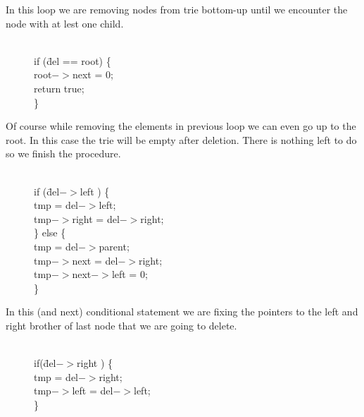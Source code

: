 \documentclass[a4paper,12pt]{article}
\begin{document}
\noindent In this loop we are removing nodes from trie bottom-up until we encounter the node with at lest one child.

\begin{figure}[!h]
\begin{tabbing}
\quad \quad \= \\
\>  if (\=del == root) \{ \\
\>\>    root$->$next = 0; \\
\>\>    return true; \\
\>  \} \\
\end{tabbing}
\end{figure}

\noindent Of course while removing the elements in previous loop we can even go up to the root. In this case the trie will be empty after deletion. There is nothing left to do so we finish the procedure.

\begin{figure}[!h]
\begin{tabbing}
\quad \quad \= \\
\>  if (\= del$->$left ) \{ \\
\>\>    tmp = del$->$left; \\
\>\>    tmp$->$right = del$->$right; \\
\>  \} else \{ \\
\>\>    tmp = del$->$parent; \\
\>\>    tmp$->$next = del$->$right; \\
\>\>    tmp$->$next$->$left = 0; \\
\>  \} \\
\end{tabbing}
\end{figure}


\noindent In this (and next) conditional statement we are fixing the pointers to the left and right brother of last node that we are going to delete.

\begin{figure}[!h]
\begin{tabbing}
\quad \quad \= \\
\>  if(\= del$->$right ) \{ \\
\>\>    tmp = del$->$right; \\
\>\>    tmp$->$left = del$->$left; \\
\>  \} \\
\end{tabbing}
\end{figure}
\end{document}
